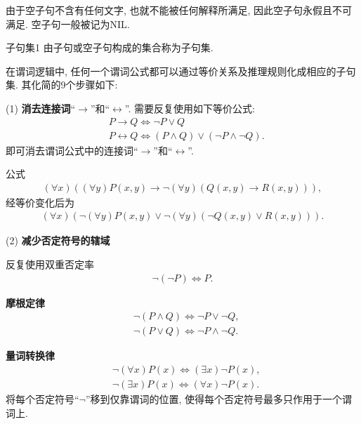 由于空子句不含有任何文字, 也就不能被任何解释所满足, 因此空子句永假且不可满足.
空子句一般被记为NIL.

\begin{mydef}{子句集}{1}
   由子句或空子句构成的集合称为子句集.
\end{mydef}

在谓词逻辑中, 任何一个谓词公式都可以通过等价关系及推理规则化成相应的子句集. 其化简的9个步骤如下:

(1) \textbf{消去连接词}“$\rightarrow$”和“$\longleftrightarrow$”. 需要反复使用如下等价公式:
\begin{align}
    &P\rightarrow Q \Leftrightarrow \neg  P\vee Q\\
    &P\longleftrightarrow Q \Leftrightarrow  (P\wedge Q)\vee (\neg P\wedge \neg Q).
\end{align}
即可消去谓词公式中的连接词“$\rightarrow$”和“$\longleftrightarrow$”.

\begin{example}\label{C3exam3.64}公式
\begin{align}
  (\forall x)((\forall y)P(x,y)\rightarrow \neg  (\forall y)(Q(x,y)\rightarrow R(x,y))),
\end{align}
经等价变化后为
\begin{align}\label{C3equa3.12}
  (\forall x)(\neg (\forall y)P(x,y)\vee \neg  (\forall y)(\neg Q(x,y)\vee R(x,y))).
\end{align}
\end{example}

(2) \textbf{减少否定符号的辖域}

反复使用双重否定率
\begin{align}
  \neg (\neg P) \Leftrightarrow  P.
\end{align}

\textbf{摩根定律}
\begin{align}
 &\neg (P\wedge Q) \Leftrightarrow \neg P\vee \neg Q,\\
 &\neg (P\vee Q) \Leftrightarrow \neg P\wedge \neg Q.
\end{align}

\textbf{量词转换律}
\begin{align}
  &\neg  (\forall x)P(x) \Leftrightarrow  (\exists  x) \neg P(x),\\
  &\neg  (\exists  x)P(x) \Leftrightarrow  (\forall x)\neg P(x).
\end{align}
将每个否定符号“$\neg$”移到仅靠谓词的位置, 使得每个否定符号最多只作用于一个谓词上.


